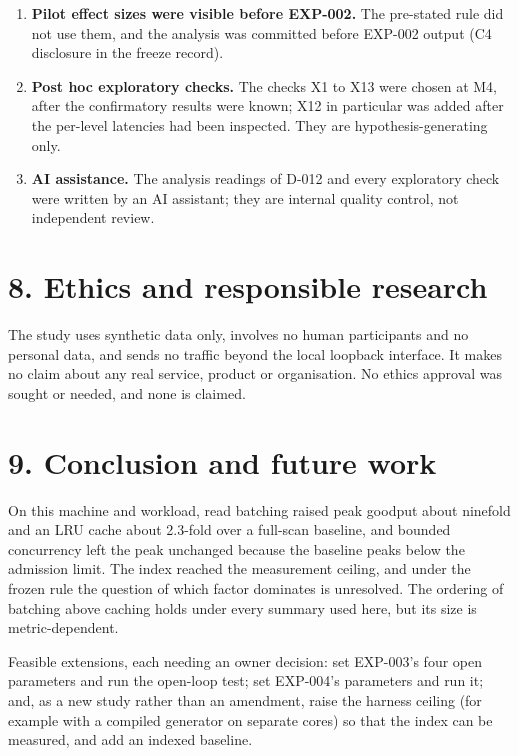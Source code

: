 \documentclass[
]{article}
\begin{document}
\begin{enumerate}
  \textbf{Shared CPU and scheduler.} Generator and server share the
  cores; the placement on performance or efficiency cores is not
  controllable.
\item
  \textbf{Pilot effect sizes were visible before EXP-002.} The
  pre-stated rule did not use them, and the analysis was committed
  before EXP-002 output (C4 disclosure in the freeze record).
\item
  \textbf{Post hoc exploratory checks.} The checks X1 to X13 were chosen
  at M4, after the confirmatory results were known; X12 in particular
  was added after the per-level latencies had been inspected. They are
  hypothesis-generating only.
\item
  \textbf{AI assistance.} The analysis readings of D-012 and every
  exploratory check were written by an AI assistant; they are internal
  quality control, not independent review.
\end{enumerate}

\section{8. Ethics and responsible
research}\label{ethics-and-responsible-research}

The study uses synthetic data only, involves no human participants and
no personal data, and sends no traffic beyond the local loopback
interface. It makes no claim about any real service, product or
organisation. No ethics approval was sought or needed, and none is
claimed.

\section{9. Conclusion and future
work}\label{conclusion-and-future-work}

On this machine and workload, read batching raised peak goodput about
ninefold and an LRU cache about 2.3-fold over a full-scan baseline, and
bounded concurrency left the peak unchanged because the baseline peaks
below the admission limit. The index reached the measurement ceiling,
and under the frozen rule the question of which factor dominates is
unresolved. The ordering of batching above caching holds under every
summary used here, but its size is metric-dependent.

Feasible extensions, each needing an owner decision: set EXP-003's four
open parameters and run the open-loop test; set EXP-004's parameters and
run it; and, as a new study rather than an amendment, raise the harness
ceiling (for example with a compiled generator on separate cores) so
that the index can be measured, and add an indexed baseline.
\end{document}
